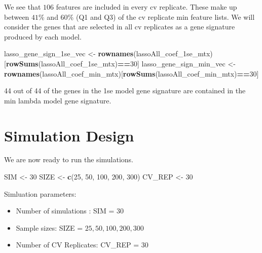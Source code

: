 \documentclass[
]{book}
\newenvironment{Shaded}{\begin{snugshade}}{\end{snugshade}}
\newcommand{\DecValTok}[1]{\textcolor[rgb]{0.00,0.00,0.81}{#1}}
\newcommand{\KeywordTok}[1]{\textcolor[rgb]{0.13,0.29,0.53}{\textbf{#1}}}
\newcommand{\NormalTok}[1]{#1}
\newcommand{\OperatorTok}[1]{\textcolor[rgb]{0.81,0.36,0.00}{\textbf{#1}}}
\newcommand{\StringTok}[1]{\textcolor[rgb]{0.31,0.60,0.02}{#1}}
\begin{document}
We see that \(106\) features are included in every
cv replicate. These make up between
\(41\)\%
and
\(60\)\%
(Q1 and Q3) of the cv replicate min feature lists.
We will consider the genes that are selected in all cv replicates as a
gene signature produced by each model.

\begin{Shaded}
\begin{Highlighting}[]
\NormalTok{lasso\_gene\_sign\_1se\_vec <{-}}\StringTok{ }\KeywordTok{rownames}\NormalTok{(lassoAll\_coef\_1se\_mtx)[}\KeywordTok{rowSums}\NormalTok{(lassoAll\_coef\_1se\_mtx)}\OperatorTok{==}\DecValTok{30}\NormalTok{]}
\NormalTok{lasso\_gene\_sign\_min\_vec <{-}}\StringTok{ }\KeywordTok{rownames}\NormalTok{(lassoAll\_coef\_min\_mtx)[}\KeywordTok{rowSums}\NormalTok{(lassoAll\_coef\_min\_mtx)}\OperatorTok{==}\DecValTok{30}\NormalTok{]}
\end{Highlighting}
\end{Shaded}

44 out of
44 of the genes in the 1se model gene signature
are contained in the min lambda model gene signature.

\hypertarget{simulation-design}{%
\section{Simulation Design}\label{simulation-design}}

We are now ready to run the simulations.

\begin{Shaded}
\begin{Highlighting}[]
\NormalTok{ SIM <{-}}\StringTok{ }\DecValTok{30}
\NormalTok{ SIZE <{-}}\StringTok{ }\KeywordTok{c}\NormalTok{(}\DecValTok{25}\NormalTok{, }\DecValTok{50}\NormalTok{, }\DecValTok{100}\NormalTok{, }\DecValTok{200}\NormalTok{, }\DecValTok{300}\NormalTok{)}
\NormalTok{ CV\_REP <{-}}\StringTok{ }\DecValTok{30}
\end{Highlighting}
\end{Shaded}

Simluation parameters:

\begin{itemize}
\item
  Number of simulations : SIM = \(30\)
\item
  Sample sizes: SIZE = \(25, 50, 100, 200, 300\)
\item
  Number of CV Replicates: CV\_REP = \(30\)
\end{itemize}
\end{document}
